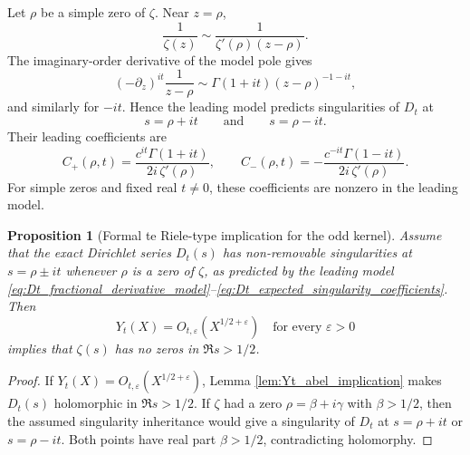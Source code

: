 \documentclass[11pt]{amsart}
\numberwithin{equation}{section}
\theoremstyle{plain}
\newtheorem{proposition}[theorem]{Proposition}
\theoremstyle{definition}
\theoremstyle{remark}
\begin{document}
Let \(\rho\) be a simple zero of \(\zeta\).  Near \(z=\rho\),
\begin{equation}
\frac1{\zeta(z)}\sim \frac{1}{\zeta'(\rho)(z-\rho)}.
\label{eq:inverse_zeta_near_simple_zero}
\end{equation}
The imaginary-order derivative of the model pole gives
\begin{equation}
(-\partial_z)^{it}\frac1{z-\rho}
\sim \Gamma(1+it)(z-\rho)^{-1-it},
\label{eq:fractional_derivative_pole_model}
\end{equation}
and similarly for \(-it\).  Hence the leading model predicts singularities of \(D_t\) at
\begin{equation}
s=\rho+it
\qquad\text{and}\qquad
s=\rho-it.
\label{eq:Dt_expected_singularities_locations}
\end{equation}
Their leading coefficients are
\begin{equation}
C_+(\rho,t)=\frac{c^{it}\Gamma(1+it)}{2i\,\zeta'(\rho)},
\qquad
C_-(\rho,t)=-\frac{c^{-it}\Gamma(1-it)}{2i\,\zeta'(\rho)}.
\label{eq:Dt_expected_singularity_coefficients}
\end{equation}
For simple zeros and fixed real \(t\neq0\), these coefficients are nonzero in the leading model.

\begin{proposition}[Formal te Riele-type implication for the odd kernel]
\label{prop:formal_te_riele_implication_Yt}
Assume that the exact Dirichlet series \(D_t(s)\) has non-removable singularities at \(s=\rho\pm it\) whenever \(\rho\) is a zero of \(\zeta\), as predicted by the leading model \eqref{eq:Dt_fractional_derivative_model}--\eqref{eq:Dt_expected_singularity_coefficients}.  Then
\begin{equation}
Y_t(X)=O_{t,\varepsilon}(X^{1/2+\varepsilon})
\quad\text{for every }\varepsilon>0
\label{eq:Yt_bound_assumption_prop}
\end{equation}
implies that \(\zeta(s)\) has no zeros in \(\Re s>1/2\).
\end{proposition}

\begin{proof}
If \(Y_t(X)=O_{t,\varepsilon}(X^{1/2+\varepsilon})\), Lemma \ref{lem:Yt_abel_implication} makes \(D_t(s)\) holomorphic in \(\Re s>1/2\).  If \(\zeta\) had a zero \(\rho=\beta+i\gamma\) with \(\beta>1/2\), then the assumed singularity inheritance would give a singularity of \(D_t\) at \(s=\rho+it\) or \(s=\rho-it\).  Both points have real part \(\beta>1/2\), contradicting holomorphy.
\end{proof}
\end{document}
